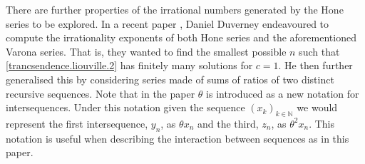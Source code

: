\documentclass{article}
\theoremstyle{remark}
\theoremstyle{definition}
\begin{document}
There are further properties of the irrational numbers generated by the Hone series to be explored. In a recent paper
\cite{duverney2020irrationality}, Daniel Duverney endeavoured to compute the irrationality exponents of both Hone series and the aforementioned Varona series. That is, they wanted to find the smallest possible $n$ such that \eqref{trancsendence.liouville.2} has finitely many solutions for $c = 1$. He then further generalised this by considering series made of sums of ratios of two distinct recursive sequences.
Note that in the paper $\theta$ is introduced as a new notation for intersequences. Under this notation given the sequence $(x_k)_{k \in \mathbb{N}}$ we would represent the first intersequence, $y_n$, as $\theta x_n$ and the third, $z_n$, as $\theta^2x_n$. This notation is useful when describing the interaction between sequences as in this paper.



\end{document}
